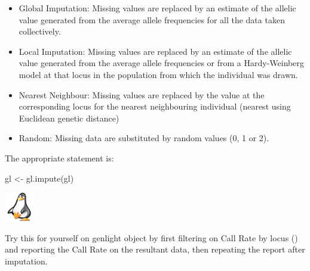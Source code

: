 \documentclass[
  letterpaper,
  DIV=11,
  numbers=noendperiod]{scrreprt}
\newenvironment{Shaded}{\begin{snugshade}}{\end{snugshade}}
\newcommand{\FunctionTok}[1]{\textcolor[rgb]{0.02,0.16,0.49}{#1}}
\newcommand{\NormalTok}[1]{\textcolor[rgb]{0.00,0.44,0.13}{#1}}
\newcommand{\OtherTok}[1]{\textcolor[rgb]{0.00,0.44,0.13}{#1}}
\providecommand{\tightlist}{%
  \setlength{\itemsep}{0pt}\setlength{\parskip}{0pt}}\usepackage{longtable,booktabs,array}
\let\textttOrig\texttt
\renewcommand{\texttt}[1]{\textttOrig{\color{blue}{#1}}}
\begin{document}
\begin{itemize}
\tightlist
\item
  Global Imputation: Missing values are replaced by an estimate of the
  allelic value generated from the average allele frequencies for all
  the data taken collectively.
\item
  Local Imputation: Missing values are replaced by an estimate of the
  allelic value generated from the average allele frequencies or from a
  Hardy-Weinberg model at that locus in the population from which the
  individual was drawn.
\item
  Nearest Neighbour: Missing values are replaced by the value at the
  corresponding locus for the nearest neighbouring individual (nearest
  using Euclidean genetic distance)
\item
  Random: Missing data are substituted by random values (0, 1 or 2).
\end{itemize}

The appropriate statement is:

\begin{Shaded}
\begin{Highlighting}[]
\NormalTok{gl }\OtherTok{\textless{}{-}} \FunctionTok{gl.impute}\NormalTok{(gl)}
\end{Highlighting}
\end{Shaded}

\begin{tcolorbox}[enhanced jigsaw, toptitle=1mm, colframe=quarto-callout-note-color-frame, title=\textcolor{quarto-callout-note-color}{\faInfo}\hspace{0.5em}{Exercise}, breakable, arc=.35mm, bottomrule=.15mm, bottomtitle=1mm, opacitybacktitle=0.6, titlerule=0mm, rightrule=.15mm, toprule=.15mm, leftrule=.75mm, coltitle=black, left=2mm, opacityback=0, colback=white, colbacktitle=quarto-callout-note-color!10!white]

\includegraphics[width=0.5in,height=0.5in]{images/task.png}

Try this for yourself on genlight object \texttt{testset.gl} by first
filtering on Call Rate by locus (\texttt{threshold\ =\ 0.90}) and
reporting the Call Rate on the resultant data, then repeating the report
after imputation.

\end{tcolorbox}
\end{document}
